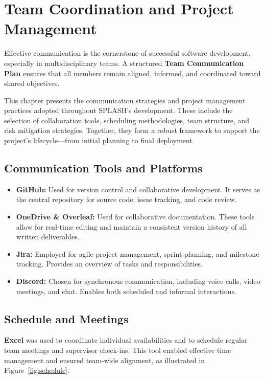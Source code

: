 
\chapter{Team Coordination and Project Management}
\label{chapter:teamplan}

Effective communication is the cornerstone of successful software development, especially in multidisciplinary teams. A structured \textbf{Team Communication Plan} ensures that all members remain aligned, informed, and coordinated toward shared objectives.

This chapter presents the communication strategies and project management practices adopted throughout SPLASH's development. These include the selection of collaboration tools, scheduling methodologies, team structure, and risk mitigation strategies. Together, they form a robust framework to support the project's lifecycle—from initial planning to final deployment.

\section{Communication Tools and Platforms}
\label{section:comunication_tools}

\begin{itemize}
    \item \textbf{GitHub:} Used for version control and collaborative development. It serves as the central repository for source code, issue tracking, and code review.
    \item \textbf{OneDrive \& Overleaf:} Used for collaborative documentation. These tools allow for real-time editing and maintain a consistent version history of all written deliverables.
    \item \textbf{Jira:} Employed for agile project management, sprint planning, and milestone tracking. Provides an overview of tasks and responsibilities.
    \item \textbf{Discord:} Chosen for synchronous communication, including voice calls, video meetings, and chat. Enables both scheduled and informal interactions.
\end{itemize}

\newpage

\section{Schedule and Meetings}
\label{section:schedule_meetings}

\textbf{Excel} was used to coordinate individual availabilities and to schedule regular team meetings and supervisor check-ins. This tool enabled effective time management and ensured team-wide alignment, as illustrated in Figure~\ref{fig:schedule}.

